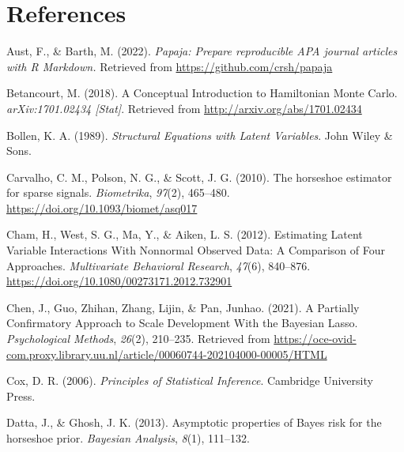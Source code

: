 \documentclass[
  man, donotrepeattitle,floatsintext]{apa6}
\newlength{\cslhangindent}
\newlength{\cslentryspacingunit} %
\newenvironment{CSLReferences}[2] %
 {%
  \setlength{\parindent}{0pt}
  \ifodd #1
  \let\oldpar\par
  \def\par{\hangindent=\cslhangindent\oldpar}
  \fi
  \setlength{\parskip}{#2\cslentryspacingunit}
 }%
 {}
\begin{document}
\begingroup
\setlength{\parindent}{-0.5in}
\setlength{\leftskip}{0.5in}

\section*{References}

\hypertarget{refs}{}
\begin{CSLReferences}{1}{0}
\leavevmode{}%
Aust, F., \& Barth, M. (2022). \emph{Papaja: {Prepare} reproducible {APA} journal articles with {R} {Markdown}.} Retrieved from \url{https://github.com/crsh/papaja}

\leavevmode{}%
Betancourt, M. (2018). A {Conceptual} {Introduction} to {Hamiltonian} {Monte} {Carlo}. \emph{arXiv:1701.02434 {[}Stat{]}}. Retrieved from \url{http://arxiv.org/abs/1701.02434}

\leavevmode{}%
Bollen, K. A. (1989). \emph{Structural {Equations} with {Latent} {Variables}}. John Wiley \& Sons.

\leavevmode{}%
Carvalho, C. M., Polson, N. G., \& Scott, J. G. (2010). The horseshoe estimator for sparse signals. \emph{Biometrika}, \emph{97}(2), 465--480. \url{https://doi.org/10.1093/biomet/asq017}

\leavevmode{}%
Cham, H., West, S. G., Ma, Y., \& Aiken, L. S. (2012). Estimating {Latent} {Variable} {Interactions} {With} {Nonnormal} {Observed} {Data}: {A} {Comparison} of {Four} {Approaches}. \emph{Multivariate Behavioral Research}, \emph{47}(6), 840--876. \url{https://doi.org/10.1080/00273171.2012.732901}

\leavevmode{}%
Chen, J., Guo, Zhihan, Zhang, Lijin, \& Pan, Junhao. (2021). A {Partially} {Confirmatory} {Approach} to {Scale} {Development} {With} the {Bayesian} {Lasso}. \emph{Psychological Methods}, \emph{26}(2), 210--235. Retrieved from \url{https://oce-ovid-com.proxy.library.uu.nl/article/00060744-202104000-00005/HTML}

\leavevmode{}%
Cox, D. R. (2006). \emph{Principles of {Statistical} {Inference}}. Cambridge University Press.

\leavevmode{}%
Datta, J., \& Ghosh, J. K. (2013). Asymptotic properties of {Bayes} risk for the horseshoe prior. \emph{Bayesian Analysis}, \emph{8}(1), 111--132.


\end{CSLReferences}
\end{document}
